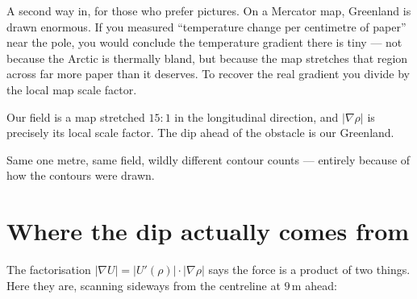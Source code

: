 \documentclass[11pt]{article}
\begin{document}
A second way in, for those who prefer pictures. On a Mercator map, Greenland
is drawn enormous. If you measured ``temperature change per centimetre of
paper'' near the pole, you would conclude the temperature gradient there is
tiny --- not because the Arctic is thermally bland, but because the map
stretches that region across far more paper than it deserves. To recover the
real gradient you divide by the local map scale factor.

Our field is a map stretched $15\!:\!1$ in the longitudinal direction, and
$|\nabla\rho|$ is precisely its local scale factor. The dip ahead of the
obstacle is our Greenland.

\begin{center}
\end{center}

\noindent
Same one metre, same field, wildly different contour counts --- entirely
because of how the contours were drawn.

\section{Where the dip actually comes from}

The factorisation $|\nabla U| = |U'(\rho)|\cdot|\nabla\rho|$ says the force
is a product of two things. Here they are, scanning sideways from the
centreline at $9$\,m ahead:
\end{document}
